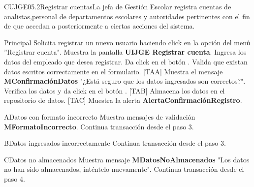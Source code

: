 \begin{UseCase}{CUJGE05.2}{Registrar cuentas}{La jefa de Gestión Escolar registra cuentas de analistas,personal de departamentos escolares y autoridades pertinentes con el fin de que accedan a posteriormente a ciertas acciones del sistema.}
\end{UseCase}

\begin{UCtrayectoria}{Principal}
  \UCpaso[\UCactor] Solicita registrar un nuevo usuario haciendo click en la opción del menú ''Registrar cuenta".
  \UCpaso Muestra la pantalla {\bf UIJGE Registrar cuenta}.
  \UCpaso[\UCactor] Ingresa los datos del empleado que desea registrar.
  \UCpaso[\UCactor] Da click en el botón .
  \UCpaso Valida que existan datos escritos correctamente en el formulario. [TAA]
  \UCpaso Muestra el mensaje {\bf MConfirmaciónDatos} "¿Está seguro que los datos ingresados son correctos?".
  \UCpaso[\UCactor] Verifica los datos y da click en el botón . [TAB]
  \UCpaso Almacena los datos en el repositorio de datos. [TAC]
  \UCpaso Muestra la alerta  {\bf AlertaConfirmaciónRegistro}.
\end{UCtrayectoria}

\begin{UCtrayectoriaA}{A}{Datos con formato incorrecto} 
  \UCpaso Muestra mensajes de validación {\bf MFormatoIncorrecto}.
  \UCpaso Continua transacción desde el paso 3.
\end{UCtrayectoriaA}

\begin{UCtrayectoriaA}{B}{Datos ingresados incorrectamente} 
  \UCpaso Continua transacción desde el paso 3.
\end{UCtrayectoriaA}

\begin{UCtrayectoriaA}{C}{Datos no almacenados} 
  \UCpaso Muestra mensaje {\bf MDatosNoAlmacenados} "Los datos no han sido almacenados, inténtelo nuevamente".
  \UCpaso Continua transacción desde el paso 4.
\end{UCtrayectoriaA}



